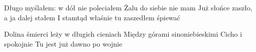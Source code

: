 \documentclass[../../../songbook.tex]{subfiles}
\begin{document}
Długo myślałem: w dół nie poleciałem			\newline
Żalu do siebie nie mam			\newline
Już słońce zaszło, a ja dalej stałem			\newline
I stamtąd właśnie tu zaszedłem śpiewać			\newline

\-\hspace{1cm} Dolina śmierci leży w długich cieniach			\newline
\-\hspace{1cm} Między górami sinoniebieskimi			\newline
\-\hspace{1cm} Cicho i spokojnie 			\newline
\-\hspace{1cm} Tu jest już dawno po wojnie	
\end{document}
